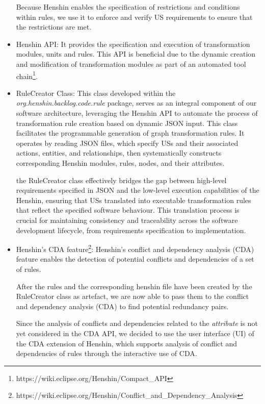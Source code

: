 \begin{itemize}
	Because Henshin enables the specification of restrictions and conditions within rules, we use it to enforce and verify US requirements to ensure that the restrictions are met.
		
	\item Henshin API: It provides the specification and execution of transformation modules, units and rules. This API is beneficial due to the dynamic creation and modification of transformation modules as part of an automated tool chain\footnote{https://wiki.eclipse.org/Henshin/Compact\_API}.
	
	\item RuleCreator Class: This class developed within the \textit{org.henshin.backlog.code.rule} package, serves as an integral component of our software architecture, leveraging the Henshin API to automate the process of transformation rule creation based on dynamic JSON input. This class facilitates the programmable generation of graph transformation rules. It operates by reading JSON files, which specify USs and their associated actions, entities, and relationships, then systematically constructs corresponding Henshin modules, rules, nodes, and their attributes.
	
	the RuleCreator class effectively bridges the gap between high-level requirements specified in JSON and the low-level execution capabilities of the Henshin, ensuring that USs translated into executable transformation rules that reflect the specified software behaviour. This translation process is crucial for maintaining consistency and traceability across the software development lifecycle, from requirements specification to implementation.
	
	\item Henshin's CDA feature\footnote{https://wiki.eclipse.org/Henshin/Conflict\_and\_Dependency\_Analysis}: Henshin's conflict and dependency analysis (CDA) feature enables the detection of potential conflicts and dependencies of a set of rules.
	
	After the rules and the corresponding henshin file have been created by the RuleCreator class as artefact, we are now able to pass them to the conflict and dependency analysis (CDA) to find potential redundancy pairs.
	
	Since the analysis of conflicts and dependencies related to the \textit{attribute} is not yet considered in the CDA API, we decided to use the user interface (UI) of the CDA extension of Henshin, which supports analysis of conflict and dependencies of rules through the interactive use of CDA.
	

\end{itemize}
